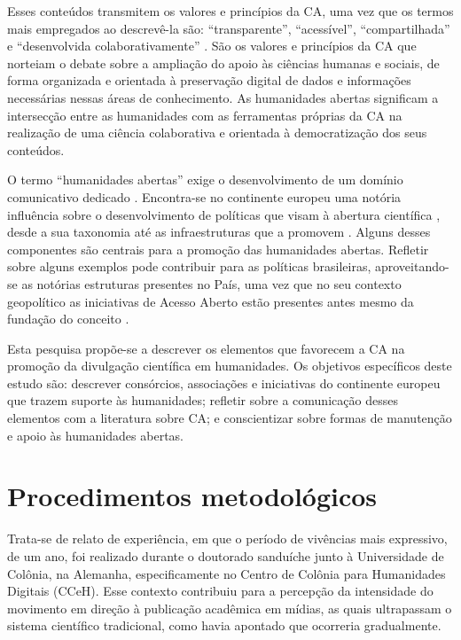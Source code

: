 \documentclass[portuguese]{textolivre}
\begin{document}
Esses conteúdos transmitem os valores e princípios da CA, uma vez que os termos mais empregados ao descrevê-la são: “transparente”, “acessível”, “compartilhada” e “desenvolvida colaborativamente” \cite{vicente2018}. São os valores e princípios da CA que norteiam o debate sobre a ampliação do apoio às ciências humanas e sociais, de forma organizada e orientada à preservação digital de dados e informações necessárias nessas áreas de conhecimento. As humanidades abertas significam a intersecção entre as humanidades com as ferramentas próprias da CA na realização de uma ciência colaborativa e orientada à democratização dos seus conteúdos.

O termo “humanidades abertas” exige o desenvolvimento de um domínio comunicativo dedicado \cite{knockelmann2019open}. Encontra-se no continente europeu uma notória influência sobre o desenvolvimento de políticas que visam à abertura científica \cite{manco2022}, desde a sua taxonomia \cite{pontika2015} até as infraestruturas que a promovem \cite{kamocki2023,mounier2023}. Alguns desses componentes são centrais para a promoção das humanidades abertas. Refletir sobre alguns exemplos pode contribuir para as políticas brasileiras, aproveitando-se as notórias estruturas presentes no País, uma vez que no seu contexto geopolítico as iniciativas de Acesso Aberto estão presentes antes mesmo da fundação do conceito \cite{delrio2022}.

Esta pesquisa propõe-se a descrever os elementos que favorecem a CA na promoção da divulgação científica em humanidades. Os objetivos específicos deste estudo são: descrever consórcios, associações e iniciativas do continente europeu que trazem suporte às humanidades; refletir sobre a comunicação desses elementos com a literatura sobre CA; e conscientizar sobre formas de manutenção e apoio às humanidades abertas.

\section{Procedimentos metodológicos}\label{sec-normas}
Trata-se de relato de experiência, em que o período de vivências mais expressivo, de um ano, foi realizado durante o doutorado sanduíche junto à Universidade de Colônia, na Alemanha, especificamente no Centro de Colônia para Humanidades Digitais (CCeH). Esse contexto contribuiu para a percepção da intensidade do movimento em direção à publicação acadêmica em mídias, as quais ultrapassam o sistema científico tradicional, como \textcite{svensson2010} havia apontado que ocorreria gradualmente.
\end{document}
